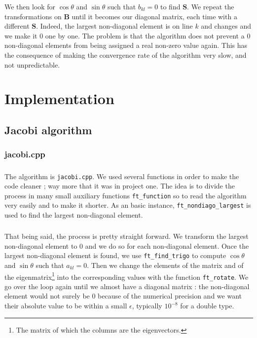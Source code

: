 \documentclass[a4paper, twoside, 11pt]{report}
\theoremstyle{theorem}
\theoremstyle{remark}
\theoremstyle{exemple}
\begin{document}
    We then look for $\cos\theta$ and $\sin\theta$ such that $b_{kl}=0$ to find $\mathbf{S}$. We repeat the transformations on $\mathbf{B}$ until it becomes our diagonal matrix, each time with a different $\mathbf{S}$. Indeed, the largest non-diagonal element is on line $k$ and changes and we make it $0$ one by one. The problem is that the algorithm does not prevent a $0$ non-diagonal elements from being assigned a real non-zero value again. This has the consequence of making the convergence rate of the algorithm very slow, and not unpredictable. 
    

\chapter{Implementation}

    \section{Jacobi algorithm}
    
   		
		\subsection{jacobi.cpp}
		
			\paragraph{}The algorithm is \texttt{jacobi.cpp}. We used several functions in order to make the code cleaner ; way more that it was in project one. The idea is to divide the process in many small auxiliary functions \texttt{ft\_function} so to read the algorithm very easily and to make it shorter. As an basic instance, \texttt{ft\_nondiago\_largest} is used to find the largest non-diagonal element.
	 
			\paragraph{}That being said, the process is pretty straight forward. We transform the largest non-diagonal element to $0$ and we do so for each non-diagonal element. Once the largest non-diagonal element is found, we use \texttt{ft\_find\_trigo} to compute $\cos\theta$ and $\sin\theta$ such that $a_{kl}=0$. Then we change the elements of the matrix and of the eigenmatrix\footnote{The matrix of which the columns are the eigenvectors.} into the corresponding values with the function \texttt{ft\_rotate}. We go over the loop again until we almost have a diagonal matrix : the non-diagonal element would not surely be $0$ because of the numerical precision and we want their absolute value to be within a small $\epsilon$, typically ${10}^{-8}$ for a double type.
		
\end{document}
